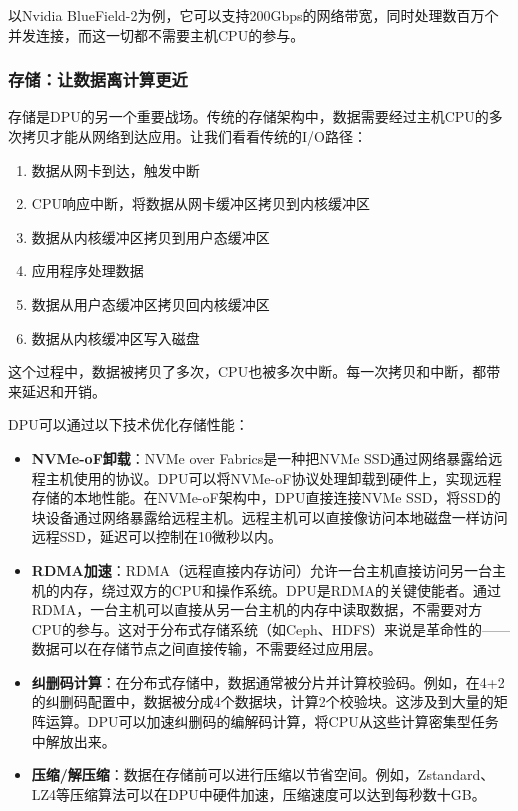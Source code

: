 以Nvidia BlueField-2为例，它可以支持200Gbps的网络带宽，同时处理数百万个并发连接，而这一切都不需要主机CPU的参与。

\subsubsection{存储：让数据离计算更近}

存储是DPU的另一个重要战场。传统的存储架构中，数据需要经过主机CPU的多次拷贝才能从网络到达应用。让我们看看传统的I/O路径：

\begin{enumerate}
    \item 数据从网卡到达，触发中断
    \item CPU响应中断，将数据从网卡缓冲区拷贝到内核缓冲区
    \item 数据从内核缓冲区拷贝到用户态缓冲区
    \item 应用程序处理数据
    \item 数据从用户态缓冲区拷贝回内核缓冲区
    \item 数据从内核缓冲区写入磁盘
\end{enumerate}

这个过程中，数据被拷贝了多次，CPU也被多次中断。每一次拷贝和中断，都带来延迟和开销。

DPU可以通过以下技术优化存储性能：

\begin{itemize}
    \item \textbf{NVMe-oF卸载}：NVMe over Fabrics是一种把NVMe SSD通过网络暴露给远程主机使用的协议。DPU可以将NVMe-oF协议处理卸载到硬件上，实现远程存储的本地性能。在NVMe-oF架构中，DPU直接连接NVMe SSD，将SSD的块设备通过网络暴露给远程主机。远程主机可以直接像访问本地磁盘一样访问远程SSD，延迟可以控制在10微秒以内。
    
    \item \textbf{RDMA加速}：RDMA（远程直接内存访问）允许一台主机直接访问另一台主机的内存，绕过双方的CPU和操作系统。DPU是RDMA的关键使能者。通过RDMA，一台主机可以直接从另一台主机的内存中读取数据，不需要对方CPU的参与。这对于分布式存储系统（如Ceph、HDFS）来说是革命性的——数据可以在存储节点之间直接传输，不需要经过应用层。
    
    \item \textbf{纠删码计算}：在分布式存储中，数据通常被分片并计算校验码。例如，在4+2的纠删码配置中，数据被分成4个数据块，计算2个校验块。这涉及到大量的矩阵运算。DPU可以加速纠删码的编解码计算，将CPU从这些计算密集型任务中解放出来。
    
    \item \textbf{压缩/解压缩}：数据在存储前可以进行压缩以节省空间。例如，Zstandard、LZ4等压缩算法可以在DPU中硬件加速，压缩速度可以达到每秒数十GB。
\end{itemize}

